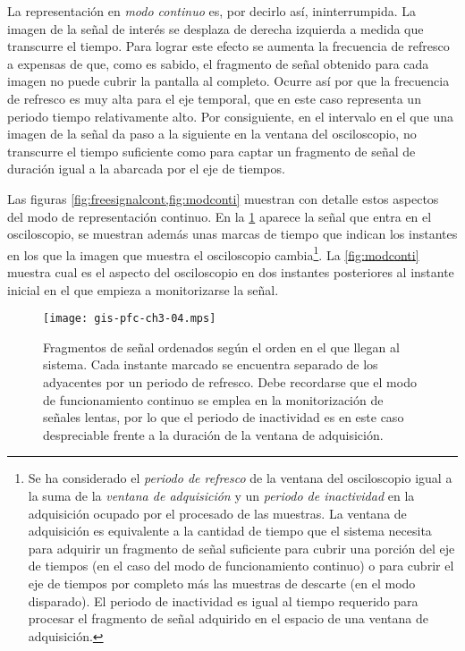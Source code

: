 La representación en \emph{modo continuo} es, por decirlo así, ininterrumpida. La imagen de la señal de interés se desplaza de derecha izquierda a medida que transcurre el tiempo. Para lograr este efecto se aumenta la frecuencia de refresco a expensas de que, como es sabido, el fragmento de señal obtenido para cada imagen no puede cubrir la pantalla al completo. Ocurre así por que la frecuencia de refresco es muy alta para el eje temporal, que en este caso representa un periodo tiempo relativamente alto. Por consiguiente, en el intervalo en el que una imagen de la señal da paso a la siguiente en la ventana del osciloscopio, no transcurre el tiempo suficiente como para captar un fragmento de señal de duración igual a la abarcada por el eje de tiempos.\par
Las figuras \cref{fig:freesignalcont,fig:modconti} muestran con detalle estos aspectos del modo de representación continuo. En la \cref{fig:freesignalcont} aparece la señal que entra en el osciloscopio, se muestran además unas marcas de tiempo que indican los instantes en los que la imagen que muestra el osciloscopio cambia\footnote{Se ha considerado el \emph{periodo de refresco} de la ventana del osciloscopio igual a la suma de la \emph{ventana de adquisición} y un \emph{periodo de inactividad} en la adquisición ocupado por el procesado de las muestras. La ventana de adquisición es equivalente a la cantidad de tiempo que el sistema necesita para adquirir un fragmento de señal suficiente para cubrir una porción del eje de tiempos (en el caso del modo de funcionamiento continuo) o para cubrir el eje de tiempos por completo más las muestras de descarte (en el modo disparado). El periodo de inactividad es igual al tiempo requerido para procesar el fragmento de señal adquirido en el espacio de una ventana de adquisición.}. La \cref{fig:modconti} muestra cual es el aspecto del osciloscopio en dos instantes posteriores al instante inicial en el que empieza a monitorizarse la señal.

\begin{figure}
	\begin{center}
		\texttt{[image: gis-pfc-ch3-04.mps]}
	\end{center}
	\caption[Fragmentos de señal ordenados según el orden en el que llegan al sistema]{Fragmentos de señal ordenados según el orden en el que llegan al sistema. Cada instante marcado se encuentra separado de los adyacentes por un periodo de refresco. Debe recordarse que el modo de funcionamiento continuo se emplea en la monitorización de señales lentas, por lo que el periodo de inactividad es en este caso despreciable frente a la duración de la ventana de adquisición.}
	\label{fig:freesignalcont}
\end{figure}

